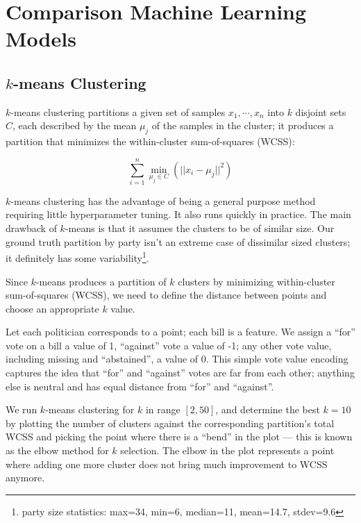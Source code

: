 
\chapter{Comparison Machine Learning Models}
\label{ch:comparison}
\vspace{2em}

\section{$k$-means Clustering}

$k$-means clustering partitions a given set of samples $x_1, \cdots, x_n$ into
$k$ disjoint sets $C$, each described by the mean $\mu_j$ of the samples in the
cluster;
it produces a partition that minimizes the within-cluster sum-of-squares (WCSS):

\[
    \sum_{i=1}^{n} \underset{\mu_j \in C}{\min}(||x_i - \mu_j||^2)
\]

$k$-means clustering has the advantage of being a general purpose method
requiring little hyperparameter tuning. It also runs quickly in practice.
The main drawback of $k$-means is that it assumes the clusters to be of similar size.
Our ground truth partition by party isn't an extreme case of dissimilar sized
clusters; it definitely has some variability\footnote{party size statistics:
max=34, min=6, median=11, mean=14.7, stdev=9.6}.

Since $k$-means produces a partition of $k$ clusters by minimizing within-cluster
sum-of-squares (WCSS), we need to define the distance between points and choose
an appropriate $k$ value.

Let each politician corresponds to a point; each bill is a feature.
We assign a ``for'' vote on a bill a value of 1, ``against'' vote a value of -1;
any other vote value, including missing and ``abstained'', a value of 0.
This simple vote value encoding captures the idea that ``for'' and ``against''
votes are far from each other; anything else is neutral and has equal distance
from ``for'' and ``against''.

We run $k$-means clustering for $k$ in range $[2, 50]$, and determine the best
$k=10$ by plotting the number of clusters against the corresponding partition's
total WCSS and picking the point where there is a ``bend'' in the plot
--- this is known as the elbow method for $k$ selection.
The elbow in the plot represents a point where adding one more cluster does not
bring much improvement to WCSS anymore.

